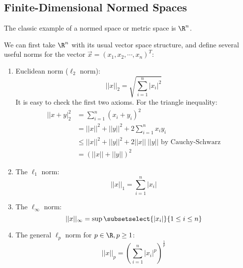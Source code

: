 \documentclass[../Main.tex]{subfiles}
\begin{document}
\subsection{Finite-Dimensional Normed Spaces}
The classic example of a normed space or metric space is $\R^n$.

We can first take $\R^n$ with its usual vector space structure, and define several useful norms for the vector $\vec{x} = (x_1, x_2, \cdots, x_n)^T$:
\begin{enumerate}
    \item Euclidean norm ($\ell_2$ norm):
        \begin{equation*}
            ||x||_2 = \sqrt{\sum_{i=1}^{n} |x_i|^2}
        \end{equation*}
        It is easy to check the first two axioms. For the triangle inequality:
        \begin{align*}
            ||x + y|_2^2 &= \sum_{i=1}^{n} (x_i + y_i)^2 \\
            &= ||x||^2 + ||y||^2 + 2\sum_{i=1}^{n} x_i y_i \\
            &\leq ||x||^2 + ||y||^2 + 2||x||~||y|| \text{ by Cauchy-Schwarz} \\
            &= (||x|| + ||y||)^2
        \end{align*}
    \item The $\ell_1$ norm:
        \begin{equation*}
            ||x||_1 = \sum_{i=1}^{n} |x_i|
        \end{equation*}
    \item The $\ell_\infty$ norm:
        \begin{equation*}
            ||x||_\infty = \sup \subsetselect{|x_i|}{1 \leq i \leq n}
        \end{equation*}
    \item The general $\ell_p$ norm for $p \in \R, p \geq 1$:
        \begin{equation*}
            ||x||_p = \left(\sum_{i=1}^{n} |x_i|^p\right)^\frac1p
        \end{equation*}
\end{enumerate}
\end{document}
